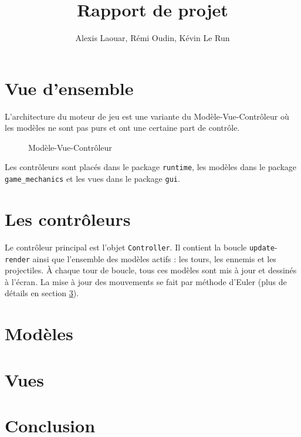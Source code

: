 \documentclass{article}
\begin{document}
\title{Rapport de projet}
\author{Alexis Laouar, R\'emi Oudin, K\'evin Le Run}
\date{}
\maketitle

\section{Vue d'ensemble}

L'architecture du moteur de jeu est une variante du Mod\`ele-Vue-Contr\^oleur o\`u les mod\`eles ne sont pas purs et ont une certaine part de contr\^ole.

\begin{figure}[h]
  \centering
  \caption{Mod\`ele-Vue-Contr\^oleur}
\end{figure}

Les contr\^oleurs sont plac\'es dans le package \texttt{runtime}, les mod\`eles dans le package \texttt{game\_mechanics} et les vues dans le package \texttt{gui}.

\section{Les contr\^oleurs}

Le contr\^oleur principal est l'objet \texttt{Controller}. Il contient la boucle \texttt{update}-\texttt{render} ainsi que l'ensemble des mod\`eles actifs : les tours, les ennemis et les projectiles. \`A chaque tour de boucle, tous ces mod\`eles sont mis \`a jour et dessin\'es \`a l'\'ecran. La mise \`a jour des mouvements se fait par m\'ethode d'Euler (plus de d\'etails en section \ref{models}).


\section{Mod\`eles} \label{models}


\section{Vues}


\section{Conclusion} %

\end{document}

